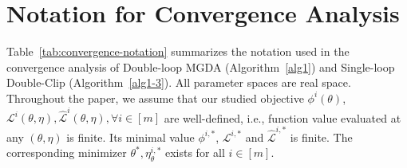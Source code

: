 \documentclass[twoside]{article} %
\def\eqref#1{equation~\ref{#1}}
\theoremstyle{plain}
\theoremstyle{definition}
\theoremstyle{remark}
\newcommand{\tepsilon}{\tilde{\epsilon}}
\newcommand{\fL}{\mathcal{L}}
\newcommand{\fhL}{\hat{\mathcal{L}}}
\begin{document}



\section{Notation for Convergence Analysis}

Table~\ref{tab:convergence-notation} summarizes the notation used
in the convergence analysis of Double-loop MGDA
(Algorithm~\ref{alg1}) and Single-loop Double-Clip
(Algorithm~\ref{alg1-3}).
All parameter spaces are real space.
Throughout the paper, we assume that our studied objective $\phi^i(\theta)$, $\fL^i(\theta, \eta),\fhL^i(\theta, \eta),\forall i\in [m]$ are well-defined, i.e., function value evaluated at any $(\theta, \eta)$ is finite. Its minimal value $\phi^{i,*}$, $\fL^{i,*}$ and $\fhL^{i,*}$ is finite. The corresponding minimizer $\theta^*, \eta_{\theta}^{i,*}$ exists for all $i\in [m]$.
\begingroup
\small
\setlength{\tabcolsep}{6pt}
\renewcommand{\arraystretch}{1.18}
\setlength{\LTleft}{0pt}
\setlength{\LTright}{0pt}
\end{document}
